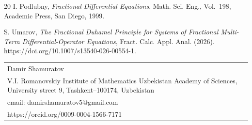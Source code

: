 \documentclass[12pt, reqno]{amsart}
\theoremstyle{definition}
\theoremstyle{remark}
\numberwithin{equation}{section}
\begin{document}
\begin{thebibliography}{20}
{\sc I. Podlubny},
{\it Fractional Differential Equations},
Math. Sci. Eng.,
Vol.~198,
Academic Press,
San Diego, 1999.

{\sc S. Umarov},
{\it The Fractional Duhamel Principle for Systems of Fractional Multi-Term Differential-Operator Equations},
Fract. Calc. Appl. Anal.
(2026).
https://doi.org/10.1007/s13540-026-00554-1.

\end{thebibliography}
\medskip

\begin{tabular}{p{9cm}}
Damir Shamuratov\\
V.I. Romanovskiy Institute of Mathematics Uzbekistan Academy of Sciences, University street 9, Tashkent--100174, Uzbekistan\\
email: damirshamuratov5@gmail.com\\
https://orcid.org/0009-0004-1566-7171
\end{tabular}
\end{document}
